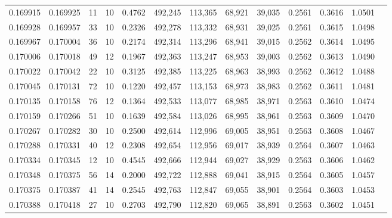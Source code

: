 \begin{tabular}{rrrrrrrrrrrrr}
0.169915 & 0.169925 &    11 &  10 &                                     0.4762 & 492,245 & 113,365 &  68,921 &  39,035 & 0.2561 & 0.3616 & 1.0501 \\
0.169928 & 0.169957 &    33 &  10 &                                     0.2326 & 492,278 & 113,332 &  68,931 &  39,025 & 0.2561 & 0.3615 & 1.0498 \\
0.169967 & 0.170004 &    36 &  10 &                                     0.2174 & 492,314 & 113,296 &  68,941 &  39,015 & 0.2562 & 0.3614 & 1.0495 \\
0.170006 & 0.170018 &    49 &  12 &                                     0.1967 & 492,363 & 113,247 &  68,953 &  39,003 & 0.2562 & 0.3613 & 1.0490 \\
0.170022 & 0.170042 &    22 &  10 &                                     0.3125 & 492,385 & 113,225 &  68,963 &  38,993 & 0.2562 & 0.3612 & 1.0488 \\
0.170045 & 0.170131 &    72 &  10 &                                     0.1220 & 492,457 & 113,153 &  68,973 &  38,983 & 0.2562 & 0.3611 & 1.0481 \\
0.170135 & 0.170158 &    76 &  12 &                                     0.1364 & 492,533 & 113,077 &  68,985 &  38,971 & 0.2563 & 0.3610 & 1.0474 \\
0.170159 & 0.170266 &    51 &  10 &                                     0.1639 & 492,584 & 113,026 &  68,995 &  38,961 & 0.2563 & 0.3609 & 1.0470 \\
0.170267 & 0.170282 &    30 &  10 &                                     0.2500 & 492,614 & 112,996 &  69,005 &  38,951 & 0.2563 & 0.3608 & 1.0467 \\
0.170288 & 0.170331 &    40 &  12 &                                     0.2308 & 492,654 & 112,956 &  69,017 &  38,939 & 0.2564 & 0.3607 & 1.0463 \\
0.170334 & 0.170345 &    12 &  10 &                                     0.4545 & 492,666 & 112,944 &  69,027 &  38,929 & 0.2563 & 0.3606 & 1.0462 \\
0.170348 & 0.170375 &    56 &  14 &                                     0.2000 & 492,722 & 112,888 &  69,041 &  38,915 & 0.2564 & 0.3605 & 1.0457 \\
0.170375 & 0.170387 &    41 &  14 &                                     0.2545 & 492,763 & 112,847 &  69,055 &  38,901 & 0.2564 & 0.3603 & 1.0453 \\
0.170388 & 0.170418 &    27 &  10 &                                     0.2703 & 492,790 & 112,820 &  69,065 &  38,891 & 0.2563 & 0.3602 & 1.0451 \\

\end{tabular}
